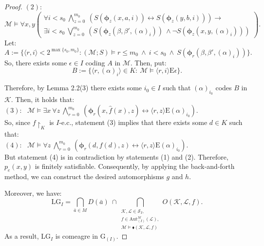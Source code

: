 \documentclass[11pt]{article}
\theoremstyle{plain}
\theoremstyle{definition}
\newcommand{\M}{\mathcal{M}}
\newcommand{\K}{\mathcal{K}}
\newcommand{\LL}{\mathcal{L}}
\newcommand{\G}{\mathrm{G}}
\newcommand{\E}{\mathrm{E}}
\newcommand{\A}{\mathrm{Aut}}
\newcommand{\LG}{\mathrm{LG}}
\begin{document}
\begin{proof}
$(2): \ \ $$\M\models\forall x,y \left(\begin{array}{c}
	\forall i<s_{0} \ \bigwedge_{z=0}^{m_{0}} \  (S(\bm{\phi}_{z}(x,a,i))\leftrightarrow S(\bm{\phi}_{z}(y,b,i))) \rightarrow\\
	\exists i<s_{0}  \ \bigvee_{z=0}^{m_{0}} \ (S(\bm{\phi}_{z}(\beta,\beta',(\alpha)_{i})) \ \wedge \neg S(\bm{\phi}_{z}(x,y,(\alpha)_{i})))
\end{array}\right). $\\

Let:
$$ A:=\{\langle r,i\rangle<2^{\max\{s_{0},m_{0}\}}: (\M;S)\models r\leq m_{0} \ \wedge \ i<s_{0} \ \wedge \ S(\bm{\phi}_{r}(\beta,\beta',(\alpha)_{i}))\}.$$
So, there exists some $\epsilon\in I$ coding $A$ in $\M$. Then, put:
$$B:=\{\langle r,(\alpha)_{i}\rangle\in K: \ \M\models \langle r,i\rangle\E \epsilon \}. $$

Therefore,  by Lemma 2.2(3) there exists some $i_{0}\in I$ such that $(\alpha)_{i_{0}}$ codes $B$ in $\K$. Then, it holds that: \\

$(3): \ \ \ $$\M\models \exists x \  \forall z \ \bigwedge_{r=0}^{m_{0}} \ (\bm{\phi}_{r}(x,\hat{f}(x),z)\leftrightarrow \langle r,z\rangle\E(\alpha)_{i_{0}}) $.\\

So, since $f\upharpoonright_{K} $ is $I$-e.c., statement (3) implies that there exists some $d\in K$ such that:\\

$(4): \ \ \ $$\M\models    \forall z \ \bigwedge_{r=0}^{m_{0}} \ (\bm{\phi}_{r}(d,f(d),z)\leftrightarrow \langle r,z\rangle\E(\alpha)_{i_{0}}) $.\\ 

But statement (4) is in contradiction by statements (1) and (2). Therefore, $p_{e}(x,y)$ is finitely satisfiable. Consequently, by applying the back-and-forth method, we can construct the desired automorphisms  $g$ and $h$.

Moreover, we have: $$\LG_{I}=\bigcap_{\bar{a}\in M}D(\bar{a}) \ \cap\bigcap_{\substack{\K,\LL\in \mathcal{S}_{I},\\ f\in\A_{(I)}^{\M}(\LL),\\\M\models\blacklozenge(\K,\LL,f)}}O(\K,\LL,f).$$ 
As a result, $\LG_{I}$ is comeagre in $\G_{(I)}$.
\end{proof}
\end{document}
